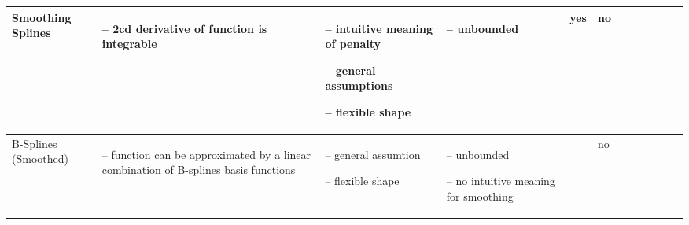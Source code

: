 \begin{table}[!ht]
\begin{tabular}{p{1.6cm}p{3.3cm}p{3.3cm}p{3.3cm}p{0.4cm}p{0.4cm}p{3cm}p{3cm}p{3cm}p{3cm}p{3cm}p{3cm}|}
		Smoothing Splines                                                                                                                                            &
		\begin{cptitemize} \item[--]  2cd derivative of function is integrable                                                        \end{cptitemize}               &
		\begin{cptitemize} \item[--]  intuitive meaning of penalty \item[--]  general assumptions \item[--]  flexible shape                         \end{cptitemize} &
		\begin{cptitemize} \item[--]  unbounded                                                                                       \end{cptitemize}               &
		yes                                                                                                                                                          &
		no                                                                                                                                                             \\ \hline%

		B-Splines (Smoothed)                                                                                                                                         &
		\begin{cptitemize} \item[--]  function can be approximated by a linear combination of B-splines basis functions               \end{cptitemize}               &
		\begin{cptitemize} \item[--]  general assumtion \item[--]  flexible shape                                                            \end{cptitemize}        &
		\begin{cptitemize} \item[--]  unbounded \item[--]  no intuitive meaning for smoothing                                                \end{cptitemize}        &
		~                                                                                                                                                            &
		no                                                                                                                                                             \\ \hline%


\end{tabular}
\end{table}
